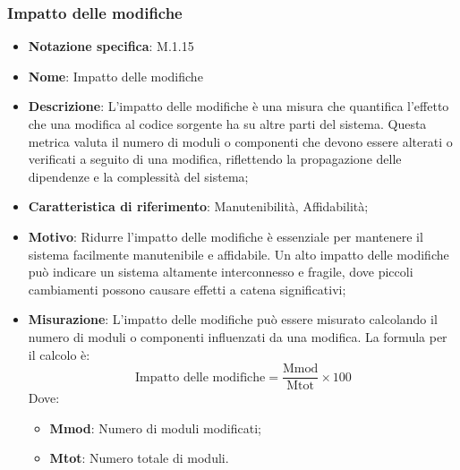 \subsubsection{Impatto delle modifiche}
\begin{itemize}
    \item \textbf{Notazione specifica}: M.1.15
    \item \textbf{Nome}: Impatto delle modifiche
    \item \textbf{Descrizione}: L'impatto delle modifiche è una misura che quantifica l'effetto che una modifica al codice sorgente ha su altre parti del sistema. Questa metrica valuta il numero di moduli o componenti che devono essere alterati o verificati a seguito di una modifica, riflettendo la propagazione delle dipendenze e la complessità del sistema;
    \item \textbf{Caratteristica di riferimento}: Manutenibilità, Affidabilità;
    \item \textbf{Motivo}: Ridurre l'impatto delle modifiche è essenziale per mantenere il sistema facilmente manutenibile e affidabile. Un alto impatto delle modifiche può indicare un sistema altamente interconnesso e fragile, dove piccoli cambiamenti possono causare effetti a catena significativi;
    \item \textbf{Misurazione}: L'impatto delle modifiche può essere misurato calcolando il numero di moduli o componenti influenzati da una modifica. La formula per il calcolo è:
    \begin{equation}
    \text{Impatto delle modifiche} = \frac{\text{Mmod}}{\text{Mtot}} \times 100
    \end{equation}
    Dove:
    \begin{itemize}
        \item \textbf{Mmod}: Numero di moduli modificati;
        \item \textbf{Mtot}: Numero totale di moduli.
    \end{itemize}
\end{itemize}
